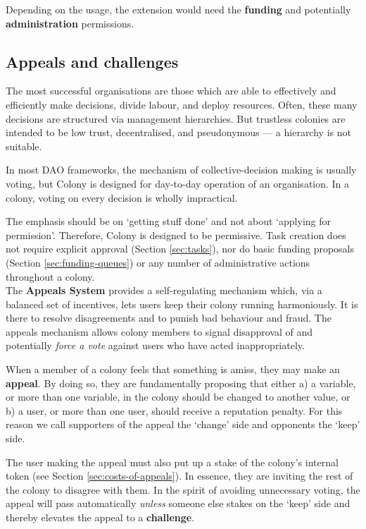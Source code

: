 Depending on the usage, the extension would need the \textbf{funding} and potentially \textbf{administration} permissions.

\subsection{Appeals and challenges}\label{sec:appeals-and-challenges}

The most successful organisations are those which are able to effectively and efficiently make decisions, divide labour, and deploy resources. Often, these many decisions are structured via management hierarchies. But trustless colonies are intended to be low trust, decentralised, and pseudonymous --- a hierarchy is not suitable.

In most DAO frameworks, the mechanism of collective-decision making is usually voting, but Colony is designed for day-to-day operation of an organisation. In a colony, voting on every decision is wholly impractical.

The emphasis should be on `getting stuff done' and not about `applying for permission'. Therefore, Colony is designed to be permissive. Task creation does not require explicit approval (Section \ref{sec:tasks}), nor do basic funding proposals (Section \ref{sec:funding-queues}) or any number of administrative actions throughout a colony. \\

The \textbf{Appeals System} provides a self-regulating mechanism which, via a balanced set of incentives, lets users keep their colony running harmoniously. It is there to resolve disagreements and to punish bad behaviour and fraud. The appeals mechanism allows colony members to signal disapproval of and potentially \textit{force a vote} against users who have acted inappropriately.

When a member of a colony feels that something is amiss, they may make an \textbf{appeal}. By doing so, they are fundamentally proposing that either a) a variable, or more than one variable, in the colony should be changed to another value, or b) a user, or more than one user, should receive a reputation penalty. For this reason we call supporters of the appeal the `change' side and opponents the `keep' side.

The user making the appeal must also put up a stake of the colony's internal token (see Section \ref{sec:costs-of-appeals}). In essence, they are inviting the rest of the colony to disagree with them. In the spirit of avoiding unnecessary voting, the appeal will pass automatically \emph{unless} someone else stakes on the `keep' side and thereby elevates the appeal to a \textbf{challenge}.

